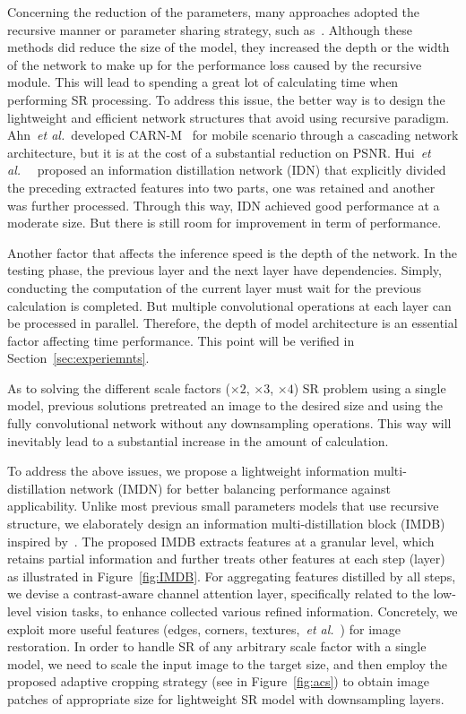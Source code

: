 \documentclass[sigconf]{acmart}
\newcommand{\etal}{\emph{et al.}~}
\begin{document}
Concerning the reduction of the parameters, many approaches adopted the recursive manner or parameter sharing strategy, such as~\cite{DRCN,DRRN,MemNet}. Although these methods did reduce the size of the model, they increased the depth or the width of the network to make up for the performance loss caused by the recursive module. This will lead to spending a great lot of calculating time when performing SR processing. To address this issue, the better way is to design the lightweight and efficient network structures that avoid using recursive paradigm. Ahn~\etal developed CARN-M~\cite{CARN} for mobile scenario through a cascading network architecture, but it is at the cost of a substantial reduction on PSNR. Hui~\etal~\cite{IDN} proposed an information distillation network (IDN) that explicitly divided the preceding extracted features into two parts, one was retained and another was further processed. Through this way, IDN achieved good performance at a moderate size. But there is still room for improvement in term of performance.

Another factor that affects the inference speed is the depth of the network. In the testing phase, the previous layer and the next layer have dependencies. Simply, conducting the computation of the current layer must wait for the previous calculation is completed. But multiple convolutional operations at each layer can be processed in parallel. Therefore, the depth of model architecture is an essential factor affecting time performance. This point will be verified in Section~\ref{sec:experiemnts}.

As to solving the different scale factors ($\times 2$, $\times 3$, $\times 4$) SR problem using a single model, previous solutions pretreated an image to the desired size and using the fully convolutional network without any downsampling operations. This way will inevitably lead to a substantial increase in the amount of calculation.  

To address the above issues, we propose a lightweight information multi-distillation network (IMDN) for better balancing performance against applicability. Unlike most previous small parameters models that use recursive structure, we elaborately design an information multi-distillation block (IMDB) inspired by~\cite{IDN}. The proposed IMDB extracts features at a granular level, which retains partial information and further treats other features at each step (layer) as illustrated in Figure~\ref{fig:IMDB}. For aggregating features distilled by all steps, we devise a contrast-aware channel attention layer, specifically related to the low-level vision tasks, to enhance collected various refined information. Concretely, we exploit more useful features (edges, corners, textures,~\etal) for image restoration. In order to handle SR of any arbitrary scale factor with a single model, we need to scale the input image to the target size, and then employ the proposed adaptive cropping strategy (see in Figure~\ref{fig:acs}) to obtain image patches of appropriate size for lightweight SR model with downsampling layers.
\end{document}
